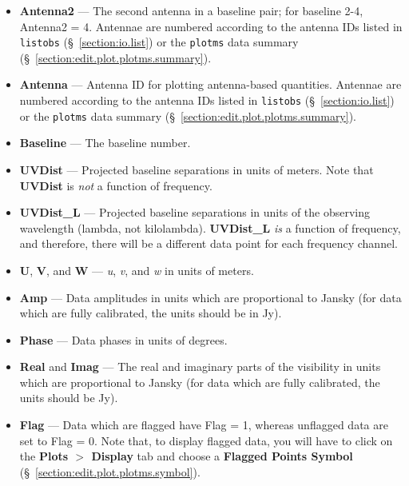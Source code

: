 \begin{itemize}
\item {\bf Antenna2} --- The second antenna in a baseline pair; for baseline 2-4, Antenna2 = 4. Antennae are numbered according to the antenna IDs listed in {\tt listobs} (\S~\ref{section:io.list}) or the {\tt plotms} data summary (\S~\ref{section:edit.plot.plotms.summary}).

\item {\bf Antenna} --- Antenna ID for plotting antenna-based quantities. Antennae are numbered according to the antenna IDs listed in {\tt listobs} (\S~\ref{section:io.list}) or the {\tt plotms} data summary (\S~\ref{section:edit.plot.plotms.summary}).

\item {\bf  Baseline} --- The baseline number.

\item {\bf UVDist} --- Projected baseline separations in units of meters. Note that {\bf UVDist} is {\it not} a function of frequency.

\item {\bf UVDist\_L} --- Projected baseline separations in units of the observing wavelength (lambda, not kilolambda). {\bf UVDist\_L} {\it is} a function of frequency, and therefore, there will be a different data point for each frequency channel.

\item {\bf U}, {\bf V}, and {\bf W} --- {\it u}, {\it v}, and {\it w} in units of meters.

\item {\bf Amp} --- Data amplitudes in units which are proportional to Jansky (for data which are fully calibrated, the units should be in Jy).

\item {\bf Phase} --- Data phases in units of degrees.

\item {\bf Real} and {\bf Imag} --- The real and imaginary parts of the visibility in units which are proportional to Jansky (for data which are fully calibrated, the units should be Jy).

\item {\bf Flag} --- Data which are flagged have Flag = 1, whereas unflagged data are set to Flag = 0. Note that, to display flagged data, you will have to click on the {\bf Plots $>$ Display} tab and choose a {\bf Flagged Points Symbol} (\S~\ref{section:edit.plot.plotms.symbol}).


\end{itemize}
